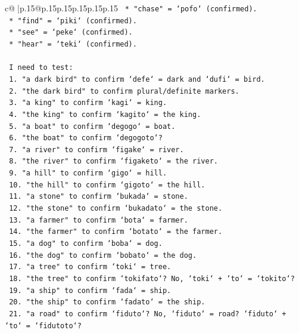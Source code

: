 \documentclass{article}
\begin{document}
{\begin{supertabular}{c@{$\;$}|p{.15\linewidth}@{}p{.15\linewidth}p{.15\linewidth}p{.15\linewidth}p{.15\linewidth}p{.15\linewidth}}
{{{\texttt{    *   "chase" = `pofo` (confirmed).} \\
\texttt{    *   "find" = `piki` (confirmed).} \\
\texttt{    *   "see" = `peke` (confirmed).} \\
\texttt{    *   "hear" = `teki` (confirmed).} \\
\\ 
\texttt{    I need to test:} \\
\texttt{    1. "a dark bird" to confirm `defe` = dark and `dufi` = bird.} \\
\texttt{    2. "the dark bird" to confirm plural/definite markers.} \\
\texttt{    3. "a king" to confirm `kagi` = king.} \\
\texttt{    4. "the king" to confirm `kagito` = the king.} \\
\texttt{    5. "a boat" to confirm `degogo` = boat.} \\
\texttt{    6. "the boat" to confirm `degogoto`?} \\
\texttt{    7. "a river" to confirm `figake` = river.} \\
\texttt{    8. "the river" to confirm `figaketo` = the river.} \\
\texttt{    9. "a hill" to confirm `gigo` = hill.} \\
\texttt{    10. "the hill" to confirm `gigoto` = the hill.} \\
\texttt{    11. "a stone" to confirm `bukada` = stone.} \\
\texttt{    12. "the stone" to confirm `bukadato` = the stone.} \\
\texttt{    13. "a farmer" to confirm `bota` = farmer.} \\
\texttt{    14. "the farmer" to confirm `botato` = the farmer.} \\
\texttt{    15. "a dog" to confirm `boba` = dog.} \\
\texttt{    16. "the dog" to confirm `bobato` = the dog.} \\
\texttt{    17. "a tree" to confirm `toki` = tree.} \\
\texttt{    18. "the tree" to confirm `tokifato`? No, `toki` + `to` = `tokito`?} \\
\texttt{    19. "a ship" to confirm `fada` = ship.} \\
\texttt{    20. "the ship" to confirm `fadato` = the ship.} \\
\texttt{    21. "a road" to confirm `fiduto`? No, `fiduto` = road? `fiduto` + `to` = `fidutoto`?} \\
}}}
\end{supertabular}}
\end{document}
